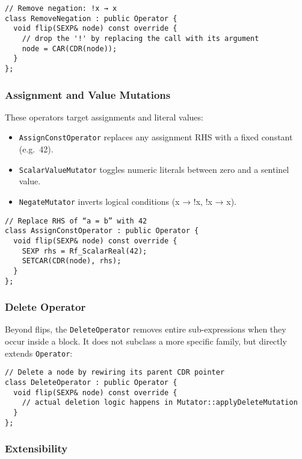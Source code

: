 \begin{verbatim}
// Remove negation: !x → x
class RemoveNegation : public Operator {
  void flip(SEXP& node) const override {
    // drop the '!' by replacing the call with its argument
    node = CAR(CDR(node));
  }
};
\end{verbatim}

\subsubsection{Assignment and Value Mutations}

These operators target assignments and literal values:

\begin{itemize}
  \item \texttt{AssignConstOperator} replaces any assignment RHS with a fixed constant (e.g.\ 42).
  \item \texttt{ScalarValueMutator} toggles numeric literals between zero and a sentinel value.
  \item \texttt{NegateMutator} inverts logical conditions (x → !x, !x → x).
\end{itemize}

\begin{verbatim}
// Replace RHS of “a = b” with 42
class AssignConstOperator : public Operator {
  void flip(SEXP& node) const override {
    SEXP rhs = Rf_ScalarReal(42);
    SETCAR(CDR(node), rhs);
  }
};
\end{verbatim}

\subsubsection{Delete Operator}

Beyond flips, the \texttt{DeleteOperator} removes entire sub-expressions when they occur inside a block. It does not subclass a more specific family, but directly extends \texttt{Operator}:

\begin{verbatim}
// Delete a node by rewiring its parent CDR pointer
class DeleteOperator : public Operator {
  void flip(SEXP& node) const override {
    // actual deletion logic happens in Mutator::applyDeleteMutation
  }
};
\end{verbatim}

\subsubsection{Extensibility}

